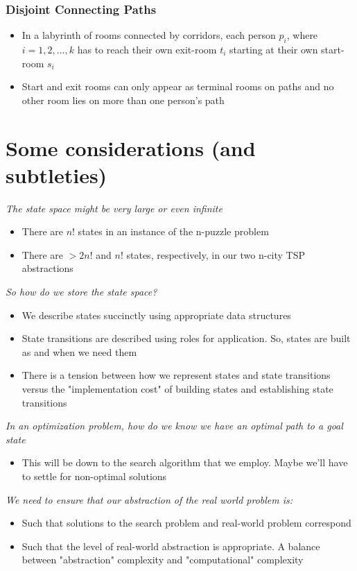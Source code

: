 \documentclass{article}[18pt]
\begin{document}
\subsubsection{Disjoint Connecting Paths}
\begin{itemize}
	\item In a labyrinth of rooms connected by corridors, each person $p_i$, where $i=1,2,...,k$ has to reach their own exit-room $t_i$ starting at their own start-room $s_i$
	\item Start and exit rooms can only appear as terminal rooms on paths and no other room lies on more than one person's path
\end{itemize}
\section{Some considerations (and subtleties)}
\textit{The state space might be very large or even infinite}
\begin{itemize}
	\item There are $n!$ states in an instance of the n-puzzle problem
	\item There are $> 2n!$ and $n!$ states, respectively, in our two n-city TSP abstractions
\end{itemize}
\textit{So how do we store the state space?}
\begin{itemize}
	\item We describe states succinctly using appropriate data structures
	\item State transitions are described using roles for application. So, states are built as and when we need them
	\item There is a tension between how we represent states and state transitions versus the "implementation cost" of building states and establishing state transitions
\end{itemize}
\textit{In an optimization problem, how do we know we have an optimal path to a goal state}
\begin{itemize}
	\item This will be down to the search algorithm that we employ. Maybe we'll have to settle for non-optimal solutions
\end{itemize}
\textit{We need to ensure that our abstraction of the real world problem is:}
\begin{itemize}
	\item Such that solutions to the search problem and real-world problem correspond
	\item Such that the level of real-world abstraction is appropriate. A balance between "abstraction" complexity and "computational" complexity
\end{itemize}
\end{document}
